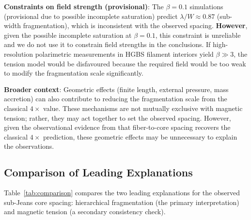 \documentclass[11pt,a4paper]{article}
\begin{document}
\textbf{Constraints on field strength (provisional)}: The $\beta = 0.1$ simulations (provisional due to possible incomplete saturation) predict $\lambda/W \approx 0.87$ (sub-width fragmentation), which is inconsistent with the observed spacing. \textbf{However}, given the possible incomplete saturation at $\beta = 0.1$, this constraint is unreliable and we do not use it to constrain field strengths in the conclusions. If high-resolution polarimetric measurements in HGBS filament interiors yield $\beta \gg 3$, the tension model would be disfavoured because the required field would be too weak to modify the fragmentation scale significantly.

\textbf{Broader context}: Geometric effects (finite length, external pressure, mass accretion) can also contribute to reducing the fragmentation scale from the classical $4\times$ value. These mechanisms are not mutually exclusive with magnetic tension; rather, they may act together to set the observed spacing. However, given the observational evidence from \citet{Yang2024} that fiber-to-core spacing recovers the classical $4\times$ prediction, these geometric effects may be unnecessary to explain the observations.

\subsection{Comparison of Leading Explanations}

Table~\ref{tab:comparison} compares the two leading explanations for the observed sub-Jeans core spacing: hierarchical fragmentation (the primary interpretation) and magnetic tension (a secondary consistency check).
\end{document}
